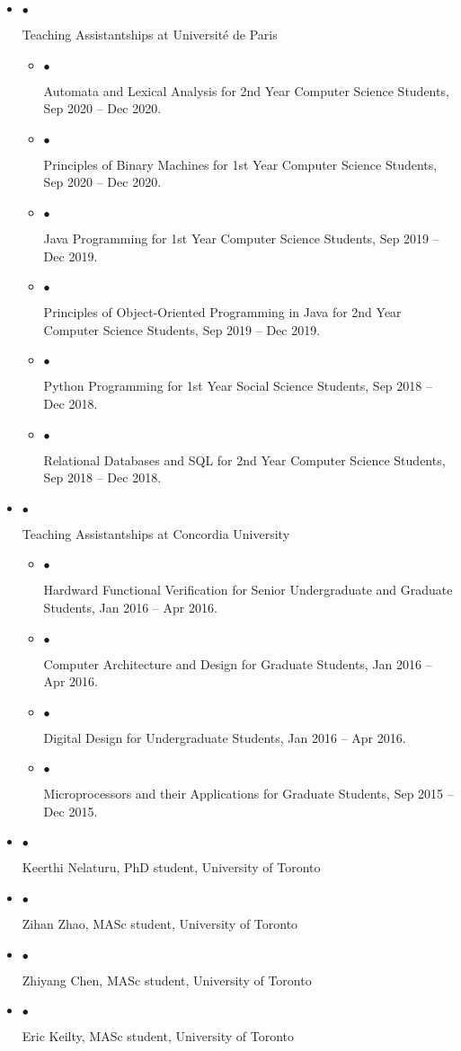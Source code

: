 \documentclass[10pt]{article}
\newcommand{\lbar}[1]{{\color{#1}\ding{118}}\hspace*{2pt}}
\newcommand{\service}[1]{\item $\bullet$ \hspace{1ex}\parbox{7.2in}{#1}}
\newenvironment{itemregion}[1]{
  \vspace*{0.5ex}
  {\scalebox{1.4}{\textbf{#1}}}
  \begin{itemize}\itemsep1pt}
  {\end{itemize}\vspace{0.8ex}}
\begin{document}
\begin{itemregion}{\lbar{red}Teaching}
  \service{Teaching Assistantships at Universit\'{e} de Paris}
  \begin{itemize}
    \service{Automata and Lexical Analysis for 2nd Year Computer Science Students, Sep 2020 -- Dec 2020.}
    \service{Principles of Binary Machines for 1st Year Computer Science Students, Sep 2020 -- Dec 2020.}
    \service{Java Programming for 1st Year Computer Science Students, Sep 2019 -- Dec 2019.}
    \service{Principles of Object-Oriented Programming in Java for 2nd Year Computer Science Students, Sep 2019 -- Dec 2019.}
    \service{Python Programming for 1st Year Social Science Students, Sep 2018 -- Dec 2018.}
    \service{Relational Databases and SQL for 2nd Year Computer Science Students, Sep 2018 -- Dec 2018.}
  \end{itemize}
  \service{Teaching Assistantships at Concordia University}
  \begin{itemize}
    \service{Hardward Functional Verification for Senior Undergraduate and Graduate Students, Jan 2016 -- Apr 2016.}
    \service{Computer Architecture and Design for Graduate Students, Jan 2016 -- Apr 2016.}
    \service{Digital Design for Undergraduate Students, Jan 2016 -- Apr 2016.}
    \service{Microprocessors and their Applications for Graduate Students, Sep 2015 -- Dec 2015.}
  \end{itemize}
\end{itemregion} 

\begin{itemregion}{\lbar{red}Mentoring}
  \service{Keerthi Nelaturu, PhD student, University of Toronto}
  \service{Zihan Zhao, MASc student, University of Toronto}
  \service{Zhiyang Chen, MASc student, University of Toronto}
  \service{Eric Keilty, MASc student, University of Toronto}
\end{itemregion} 
\end{document}
